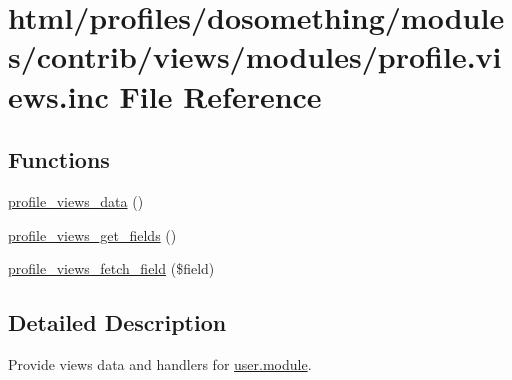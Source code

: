 \hypertarget{profile_8views_8inc}{
\section{html/profiles/dosomething/modules/contrib/views/modules/profile.views.inc File Reference}
\label{profile_8views_8inc}
}
\subsection*{Functions}
\begin{DoxyCompactItemize}
\item 
\hyperlink{profile_8views_8inc_aa426eb57d5065555896e709b6f109c30}{profile\_\-views\_\-data} ()
\item 
\hyperlink{profile_8views_8inc_a8bf1ee086c336dadb69e8fe8728f17f0}{profile\_\-views\_\-get\_\-fields} ()
\item 
\hyperlink{profile_8views_8inc_ac5cda8db9f492d20dcbf2054cd1b0ad4}{profile\_\-views\_\-fetch\_\-field} (\$field)
\end{DoxyCompactItemize}


\subsection{Detailed Description}
Provide views data and handlers for \hyperlink{user_8module}{user.module}. 

